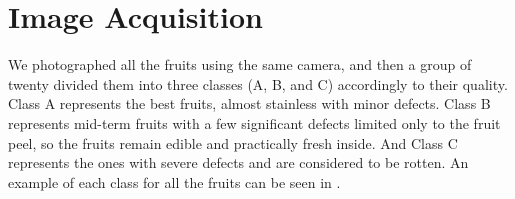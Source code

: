 \documentclass[../main.tex]{subfile}
\begin{document}
\section{Image Acquisition} \label{sec:image-acquisition}



We photographed all the fruits using the same camera, and then a group of twenty divided them into three classes (A, B, and C) accordingly to their quality. Class A represents the best fruits, almost stainless with minor defects. Class B represents mid-term fruits with a few significant defects limited only to the fruit peel, so the fruits remain edible and practically fresh inside. And Class C represents the ones with severe defects and are considered to be rotten. An example of each class for all the fruits can be seen in .
\end{document}
